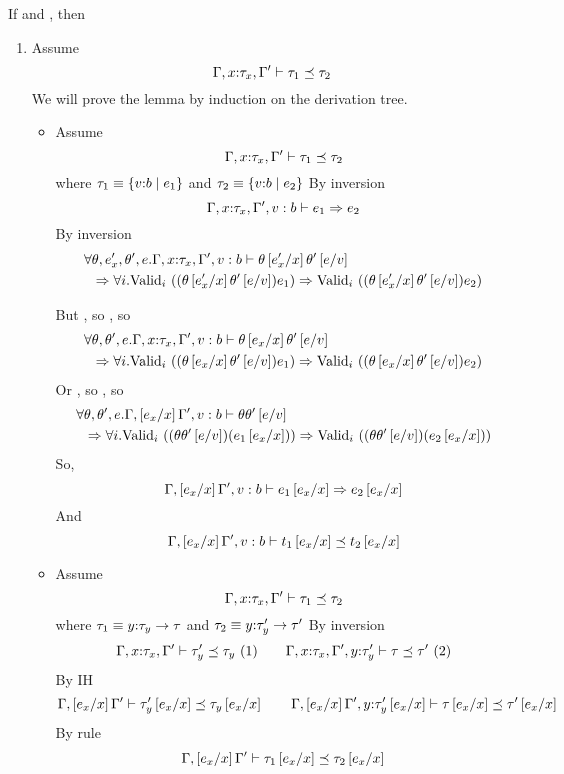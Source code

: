 If  and , then 
\begin{enumerate}
\item\label{proof:sub:sub} Assume
	$$\issubtype{\Gamma, x\colon\tau_x, \Gamma'}{\tau_1}{\tau_2}$$
We will prove the lemma by induction on the derivation tree.
\begin{itemize}
\item \rsubbase
Assume
	$$\issubtype{\Gamma, x\colon\tau_x, \Gamma'}{\tau_1}{\tau_2}$$
where $\tau_1 \equiv \tref{v}{b}{e_1}$
and   $\tau_2 \equiv \tref{v}{b}{e_2}$
By inversion
	$$
	\issubref{\Gamma, x\colon\tau_x, \Gamma',v:b}{e_1}{e_2}
	$$
By inversion
	\begin{align*}
	\forall &\theta, e'_x, \theta',e .
	\iswellformed{\Gamma, x\colon\tau_x, \Gamma',v:b}{\theta\sub{x}{e'_x}\theta'\sub{v}{e}}\\& \Rightarrow
	\generalconditionImpl{(\theta\sub{x}{e'_x}\theta'\sub{v}{e})e_1}{(\theta\sub{x}{e'_x}\theta'\sub{v}{e})e_2}
	\end{align*}

But , so , so
	\begin{align*}
	\forall &\theta, \theta',e .
	\iswellformed{\Gamma,x\colon\tau_x, \Gamma',v:b}{\theta \sub{x}{e_x}\theta'\sub{v}{e}}\\& \Rightarrow
	\generalconditionImpl{(\theta\sub{x}{e_x}\theta'\sub{v}{e})e_1}{(\theta\sub{x}{e_x}\theta'\sub{v}{e})e_2}
	\end{align*}
Or , so , so
	\begin{align*}
	\forall &\theta, \theta',e .
	\iswellformed{\Gamma,\sub{x}{e_x}\Gamma',v:b}{\theta\theta'\sub{v}{e}}\\& \Rightarrow
	\generalconditionImpl{(\theta\theta'\sub{v}{e})(e_1\sub{x}{e_x})}
						 {(\theta\theta'\sub{v}{e})(e_2\sub{x}{e_x})}
	\end{align*}
So,
	$$
	\issubref{\Gamma, \sub{x}{e_x}\Gamma',v:b}{e_1\sub{x}{e_x}}{e_2\sub{x}{e_x}}
	$$
And
	$$
	\issubtype{\Gamma, \sub{x}{e_x}\Gamma',v:b}{t_1\sub{x}{e_x}}{t_2\sub{x}{e_x}}
	$$
\item \rsubfun
Assume
	$$\issubtype{\Gamma, x\colon\tau_x, \Gamma'}{\tau_1}{\tau_2}$$
where $\tau_1 \equiv \tfun{y}{\tau_y}{\tau}$
and   $\tau_2 \equiv \tfun{y}{\tau'_y}{\tau'}$
By inversion
	$$
	\issubtype{\Gamma, x\colon\tau_x, \Gamma'}{\tau'_y}{\tau_y}\ (1) \qquad
	\issubtype{\Gamma, x\colon\tau_x, \Gamma',y\colon\tau'_y}{\tau}{\tau'}\ (2)
	$$
By IH	
	$$
	\issubtype{\Gamma, \sub{x}{e_x}\Gamma'}{\tau'_y\sub{x}{e_x}}{\tau_y\sub{x}{e_x}} \qquad
	\issubtype{\Gamma, \sub{x}{e_x}\Gamma',y\colon\tau'_y\sub{x}{e_x}}{\tau\sub{x}{e_x}}{\tau'\sub{x}{e_x}}
	$$
By rule \rsubfun	
	$$
	\issubtype{\Gamma, \sub{x}{e_x}\Gamma'}{\tau_1\sub{x}{e_x}}{\tau_2\sub{x}{e_x}}
	$$
\end{itemize}


\end{enumerate}
